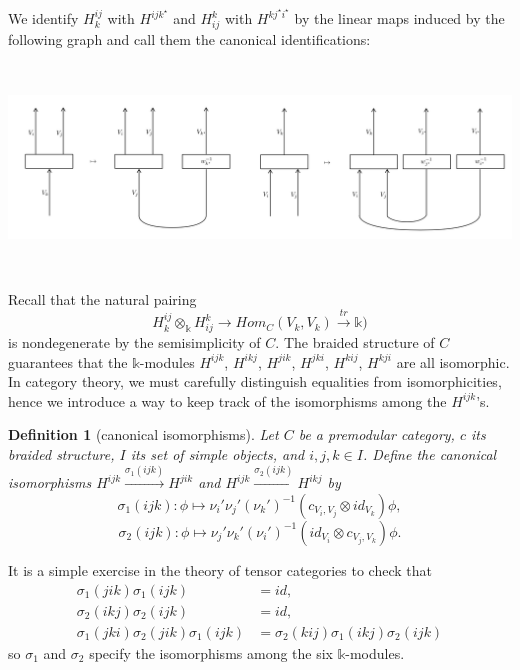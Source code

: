 \documentclass[12pt]{extarticle}
\numberwithin{equation}{section} %
\theoremstyle{mystyle}
\newtheorem{definition}[equation]{Definition}
\begin{document}
\noindent We identify $H_{k}^{ij}$ with $H^{ijk^{\star}}$ and
$H_{ij}^{k}$ with $H^{kj^{\star}i^{\star}}$ by the linear maps
induced by the following graph and call them the canonical
identifications:
\begin{center}
  \includegraphics[height=5.5cm]{identification}
\end{center}
\noindent Recall that the natural pairing
$$H^{ij}_{k} \otimes_{\mathbb{k}} H_{ij}^{k} \to Hom_{C}(V_{k},V_{k}) \xrightarrow{tr} \mathbb{k})$$
is nondegenerate by the semisimplicity of $C$. The braided
structure of $C$ guarantees that the $\mathbb{k}$-modules
$H^{ijk}$, $H^{ikj}$, $H^{jik}$, $H^{jki}$, $H^{kij}$, $H^{kji}$
are all isomorphic. In category theory, we must carefully
distinguish equalities from isomorphicities, hence we introduce a
way to keep track of the isomorphisms among the $H^{ijk}$'s.

\begin{definition}[canonical isomorphisms]\label{def/canonical-isomorphism}
  Let $C$ be a premodular category, $c$ its braided structure,
  $I$ its set of simple objects, and $i,j,k \in I$. Define the
  canonical isomorphisms
  $H^{ijk} \xrightarrow{\sigma_{1}(ijk)} H^{jik}$ and
  $H^{ijk} \xrightarrow{\sigma_{2}(ijk)} H^{ikj}$ by
  $$\sigma_{1}(ijk): \phi \mapsto \nu_{i}'\nu_{j}'(\nu_{k}')^{-1}(c_{V_{i}, V_{j}} \otimes id_{V_{k}})\phi,$$
  $$\sigma_{2}(ijk): \phi \mapsto \nu_{j}'\nu_{k}'(\nu_{i}')^{-1}(id_{V_{i}} \otimes c_{V_{j}, V_{k}})\phi.$$
\end{definition}

\noindent It is a simple exercise in the theory of tensor
categories to check that
\begin{equation} \label{eq1}
  \begin{split}
    \sigma_{1}(jik)\sigma_{1}(ijk) & = id, \\
    \sigma_{2}(ikj)\sigma_{2}(ijk) & = id, \\
    \sigma_{1}(jki)\sigma_{2}(jik)\sigma_{1}(ijk) & = \sigma_{2}(kij)\sigma_{1}(ikj)\sigma_{2}(ijk)
  \end{split}
\end{equation}
so $\sigma_{1}$ and $\sigma_{2}$ specify the isomorphisms among
the six $\mathbb{k}$-modules.
\end{document}
